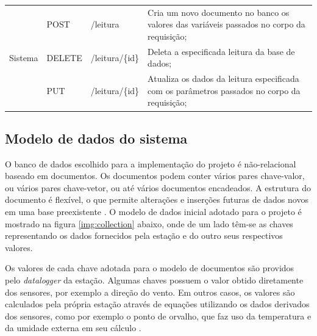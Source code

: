 \begin{table}[!h]
\begin{adjustbox}{max width=\textwidth}
\begin{tabular}{@{} p{8.5cm} | l l p{10cm} @{}}
\multirow{3}{*}{Sistema}             & POST   & /leitura                           & Cria um novo documento no banco os valores das variáveis passados no corpo da requisição;    \\ \cline{2-4}
                                     & DELETE & /leitura/\{id\}                    & Deleta a especificada leitura da base de dados;                                              \\ \cline{2-4}
                                     & PUT    & /leitura/\{id\}                    & Atualiza os dados da leitura especificada com os parâmetros passados no corpo da requisição; \\ %
\bottomrule
                                      
\end{tabular}
\end{adjustbox}
\end{table}





\subsection{Modelo de dados do sistema} \label{subsec:datamodel}

O banco de dados escolhido para a implementação do projeto é não-relacional baseado em documentos. Os documentos podem conter vários pares chave-valor, ou vários pares chave-vetor, ou até vários documentos encadeados. A estrutura do documento é flexível, o que permite alterações e inserções futuras de dados novos em uma base preexistente \cite{SITEMONGODB}. O modelo de dados inicial adotado para o projeto é mostrado na figura \ref{img:collection} abaixo, onde de um lado têm-se as chaves representando os dados fornecidos pela estação e do outro seus respectivos valores.

\newpage

Os valores de cada chave adotada para o modelo de documentos são providos pelo \textit{datalogger} da estação. Algumas chaves possuem o valor obtido diretamente dos sensores, por exemplo a direção do vento. Em outros casos, os valores são calculados pela própria estação através de equações utilizando os dados derivados dos sensores, como por exemplo o ponto de orvalho, que faz uso da temperatura e da umidade externa em seu cálculo \cite{SITEVARIAVEIS}.
